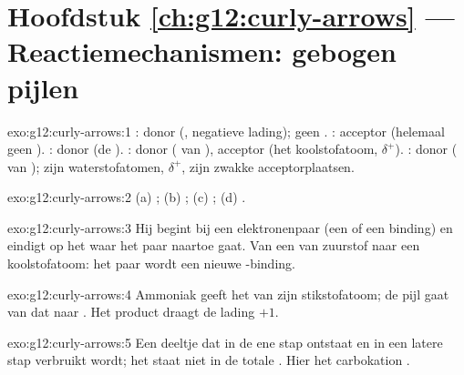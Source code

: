 \section*{Hoofdstuk \ref{ch:g12:curly-arrows} --- Reactiemechanismen: gebogen pijlen}

\begin{solution}{exo:g12:curly-arrows:1}
: donor (, negatieve lading); geen
. : acceptor (helemaal geen ).
: donor (de ). : donor ( van ), acceptor (het koolstofatoom,
$\delta^+$). : donor ( van ); zijn
waterstofatomen, $\delta^+$, zijn zwakke acceptorplaatsen.
\end{solution}

\begin{solution}{exo:g12:curly-arrows:2}
(a) ; (b) ; (c) ; (d) .
\end{solution}

\begin{solution}{exo:g12:curly-arrows:3}
Hij begint bij een elektronenpaar (een  of een
binding) en eindigt op het  waar het paar naartoe gaat. Van een  van zuurstof naar een koolstofatoom: het paar wordt een
nieuwe -binding.
\end{solution}

\begin{solution}{exo:g12:curly-arrows:4}
Ammoniak geeft het  van zijn stikstofatoom; de pijl
gaat van dat  naar . Het product 
draagt de lading $+1$.
\end{solution}

\begin{solution}{exo:g12:curly-arrows:5}
Een deeltje dat in de ene stap ontstaat en in een latere stap verbruikt
wordt; het staat niet in de totale . Hier het
carbokation .
\end{solution}

